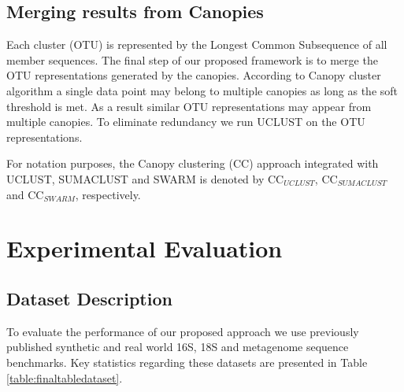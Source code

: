 \documentclass[10pt, conference, compsocconf]{IEEEtran}
\begin{document}
\subsection{\textbf{Merging results from Canopies}}

Each cluster (OTU) is represented by the Longest Common Subsequence of all member sequences. The final step of 
our proposed framework is to merge the 
OTU representations generated by the 
canopies. According to Canopy cluster algorithm a single data point may
belong to multiple canopies as long as the soft threshold is met. As a result 
similar OTU representations may appear from multiple canopies. To eliminate redundancy we run UCLUST on the 
OTU representations.


For notation purposes, 
the Canopy clustering (CC)  approach 
integrated with UCLUST, SUMACLUST and SWARM 
is denoted by CC$_{UCLUST}$, CC$_{SUMACLUST}$ and CC$_{SWARM}$, respectively. %

\section{Experimental Evaluation}
\label{sec:Experimental}

\subsection{\textbf{Dataset Description}}

To evaluate the performance of our proposed approach we use previously 
published synthetic and real world 16S, 18S and metagenome sequence benchmarks. Key statistics 
regarding these datasets are presented in Table \ref{table:finaltabledataset}. 
\end{document}

